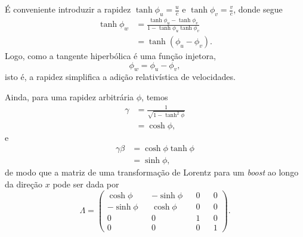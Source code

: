 \documentclass[12pt,a4paper]{article}
\numberwithin{equation}{section}
\begin{document}
É conveniente introduzir a rapidez \(\tanh \phi_u = \frac{u}{c}\) e \(\tanh \phi_v = \frac{v}{c}\), donde segue
\begin{align*}
    \tanh \phi_w &= \frac{\tanh \phi_u - \tanh \phi_v}{1 - \tanh \phi_u \tanh \phi_v}\\
                 &= \tanh\left(\phi_u - \phi_v\right).
\end{align*}
Logo, como a tangente hiperbólica é uma função injetora,
\begin{equation*}
    \phi_w = \phi_u - \phi_v,
\end{equation*}
isto é, a rapidez simplifica a adição relativística de velocidades.

Ainda, para uma rapidez arbitrária \(\phi\), temos
\begin{align*}
    \gamma &= \frac{1}{\sqrt{1 - \tanh^2\phi}}\\
           &= \cosh \phi,
\end{align*}
e
\begin{align*}
    \gamma \beta &= \cosh \phi \tanh \phi\\
                 &= \sinh \phi,
\end{align*}
de modo que a matriz de uma transformação de Lorentz para um \textit{boost} ao longo da direção \(x\) pode ser dada por
\begin{equation*}
    \Lambda = \begin{pmatrix}
        \cosh \phi && -\sinh \phi && 0 && 0\\
        -\sinh \phi && \cosh \phi && 0 && 0\\
        0 && 0 && 1 && 0 \\
        0 && 0 && 0 && 1
    \end{pmatrix}.
\end{equation*}
\end{document}
